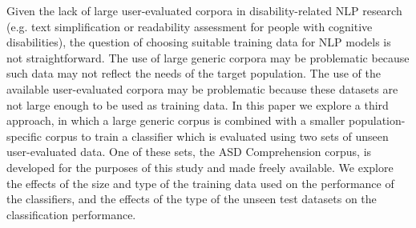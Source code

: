 Given the lack of large user-evaluated corpora in disability-related NLP research (e.g. text simplification or readability assessment for people with cognitive disabilities), the question of choosing suitable training data for NLP models is not straightforward. The use of large generic corpora may be problematic because such data may not reflect the needs of the target population. The use of the available user-evaluated corpora may be problematic because these datasets are not large enough to be used as training data. In this paper we explore a third approach, in which a large generic corpus is combined with a smaller population-specific corpus to train a classifier which is evaluated using two sets of unseen user-evaluated data. One of these sets, the ASD Comprehension corpus, is developed for the purposes of this study and made freely available. We explore the effects of the size and type of the training data used on the performance of the classifiers, and the effects of the type of the unseen test datasets on the classification performance.
